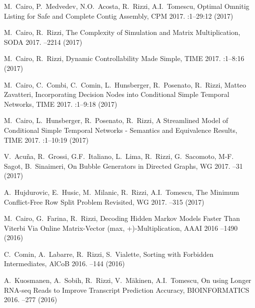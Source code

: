 
\begin{etaremune}

  \item {\sc M.~Cairo, P.~Medvedev, N.O.~Acosta, R.~Rizzi, A.I.~Tomescu},
   \newblock Optimal Omnitig Listing for Safe and Complete Contig Assembly,
   \newblock CPM 2017.
   :1--29:12 (2017)

  \item {\sc M.~Cairo, R.~Rizzi},
   \newblock The Complexity of Simulation and Matrix Multiplication,
   \newblock SODA 2017.
   --2214 (2017)

  \item {\sc M.~Cairo, R.~Rizzi},
   \newblock Dynamic Controllability Made Simple,
   \newblock TIME 2017.
   :1--8:16 (2017)

  \item {\sc M.~Cairo, C.~Combi, C.~Comin, L.~Hunsberger, R.~Posenato, R.~Rizzi, Matteo Zavatteri},
   \newblock Incorporating Decision Nodes into Conditional Simple Temporal Networks,
   \newblock TIME 2017.
   :1--9:18 (2017)

  \item {\sc M.~Cairo, L.~Hunsberger, R.~Posenato, R.~Rizzi},
   \newblock A Streamlined Model of Conditional Simple Temporal Networks - Semantics and Equivalence Results,
   \newblock TIME 2017.
   :1--10:19 (2017)

  \item {\sc V.~Acu\~na, R.~Grossi, G.F.~Italiano, L.~Lima, R.~Rizzi, G.~Sacomoto, M-F. Sagot, B.~Sinaimeri},
   \newblock On Bubble Generators in Directed Graphs,
   \newblock  WG 2017.
   --31 (2017)

  \item {\sc A.~Hujdurovic, E.~Husic, M.~Milanic, R.~Rizzi, A.I.~Tomescu},
   \newblock The Minimum Conflict-Free Row Split Problem Revisited,
   \newblock  WG 2017.
   --315 (2017)

  \item {\sc M.~Cairo, G.~Farina, R.~Rizzi},
   \newblock Decoding Hidden Markov Models Faster Than Viterbi Via Online Matrix-Vector (max, +)-Multiplication,
   \newblock AAAI 2016
   --1490 (2016)

  \item {\sc C.~Comin, A.~Labarre, R.~Rizzi, S.~Vialette},
   \newblock Sorting with Forbidden Intermediates,
   \newblock AlCoB 2016.
   --144 (2016)

  \item {\sc A.~Kuosmanen, A.~Sobih, R.~Rizzi, V.~Mäkinen, A.I.~Tomescu},
   \newblock On using Longer RNA-seq Reads to Improve Transcript Prediction Accuracy,
   \newblock BIOINFORMATICS 2016.
   --277 (2016)


\end{etaremune}
